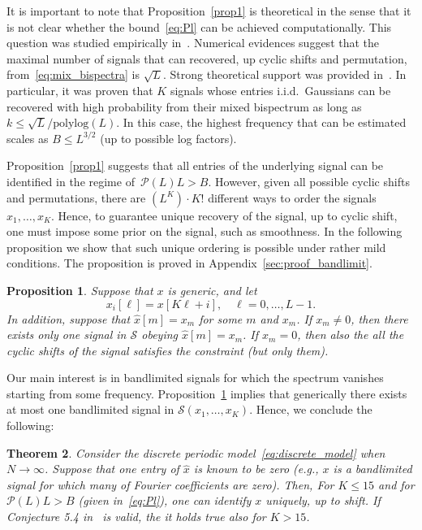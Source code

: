 \documentclass[english,12pt]{article}
\newcommand{\hx}{\hat{x}}
\newcommand{\TODO}[1]{{\color{red}{[#1]}}}
\newtheorem{thm}{Theorem}
\numberwithin{equation}{section}
\numberwithin{thm}{section} %
\newtheorem{prop}[thm]{Proposition}
\begin{document}
It is important to note that Proposition~\eqref{prop1} is theoretical in the sense that it is not clear whether the bound~\eqref{eq:Pl} can be achieved computationally.  
This question was studied empirically in~\cite{boumal2018heterogeneous}. Numerical evidences suggest that the maximal number of signals that can recovered, up cyclic shifts and permutation, from~\eqref{eq:mix_bispectra} is $\sqrt{L}$. 
Strong theoretical support was provided in~\cite{weinthesis}. In particular,  it was proven that $K$ signals whose entries i.i.d.\ Gaussians can be recovered with high probability from their mixed bispectrum as long as $k\leq \sqrt{L}/\text{polylog}(L)$.
In this case, the highest frequency that can be estimated scales as $B\leq L^{3/2}$ (up to possible log factors). 



Proposition~\ref{prop1} suggests that all entries of the underlying signal can be identified in the regime of~$\mathcal{P}(L)L>B$. However, given all possible cyclic shifts and permutations, there are $(L^K)\cdot K!$ \TODO{check this number}  different ways to order the signals $x_1,\ldots,x_K$. Hence, to guarantee unique recovery of the signal, up to cyclic shift, one must impose some prior on the signal, such as smoothness. In the following proposition we show that such unique ordering is possible under rather mild conditions.
The proposition is proved  in Appendix~\ref{sec:proof_bandlimit}.
\begin{prop} \label{prop:bandlimit}
Suppose that $x$ is generic, and let 
\begin{equation} \label{eq:sub_signals}
x_i[\ell] = x[K\ell + i], \quad \ell=0,\ldots,L-1.
\end{equation}
In addition, suppose that $\hx[m]=x_m$ for some $m$ and $x_m$.
If $x_m\neq 0$, then there exists only one signal in $\mathcal{S}$ obeying $\hx[m]=x_m$. If $x_m=0$, then also the all the cyclic shifts of the signal satisfies the constraint (but only them). 
\end{prop}	

Our main interest is in bandlimited signals for which the spectrum vanishes starting from some frequency. Proposition~\ref{prop:bandlimit} implies that generically there exists at most one bandlimited signal in  $\mathcal{S}(x_1,\ldots,x_K)$.  
Hence, we conclude the following:
\begin{thm} \label{thm:discrete}
Consider the  discrete periodic model~\eqref{eq:discrete_model} when $N\to\infty$. Suppose that one entry of $\hx$ is known to be zero (e.g., $x$ is a bandlimited signal for which many of Fourier coefficients are zero). 
Then, For $K\leq 15$ and for $\mathcal{P}(L)L>B$ (given in~\eqref{eq:Pl}), one can identify $x$ uniquely, up to shift. 
If Conjecture 5.4 in~\cite{bandeira2017estimation} is valid, the it holds true also for $K>15$.
\end{thm}
\end{document}
